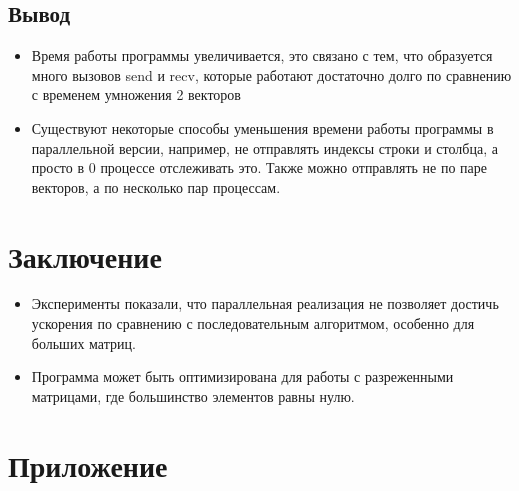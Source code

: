 \documentclass[a4paper,12pt]{article}
\begin{document}
\subsection*{Вывод}
\begin{itemize}
    \item Время работы программы увеличивается, это связано с тем, что образуется много вызовов send и recv, которые работают достаточно долго по сравнению с временем умножения 2 векторов
    \item Существуют некоторые способы уменьшения времени работы программы в параллельной версии, например, не отправлять индексы строки и столбца, а просто в 0 процессе отслеживать это. Также можно отправлять не по паре векторов, а по несколько пар процессам.
\end{itemize}
\section{Заключение}
\begin{itemize}
    \item Эксперименты показали, что параллельная реализация не позволяет достичь ускорения по сравнению с последовательным алгоритмом, особенно для больших матриц.
    \item Программа может быть оптимизирована для работы с разреженными матрицами, где большинство элементов равны нулю.
\end{itemize}
\section{Приложение}
\end{document}

